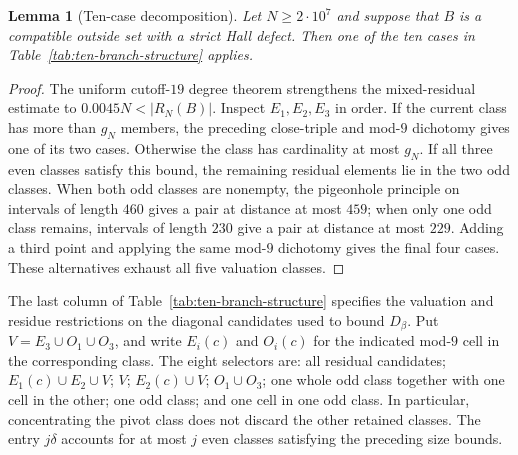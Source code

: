 \documentclass[11pt]{article}
\newtheorem{lemma}[theorem]{Lemma}
\theoremstyle{definition}
\newcommand{\RN}{R_N}
\newcommand{\TwentyMillion}{2\cdot10^7}
\begin{document}
\begin{lemma}[Ten-case decomposition]\label{lem:global-ten-branch-allocation}
Let $N\geq\TwentyMillion$ and suppose that $B$ is a compatible outside set
with a strict Hall defect.  Then one of the ten cases in
Table~\ref{tab:ten-branch-structure} applies.
\end{lemma}

\begin{proof}
The uniform cutoff-$19$ degree theorem strengthens the mixed-residual estimate
to $0.0045N<|\RN(B)|$.  Inspect $E_1,E_2,E_3$ in order.  If the current class
has more than $g_N$ members, the preceding close-triple and mod-$9$
 dichotomy gives one of its two cases.  Otherwise the class has cardinality at
 most $g_N$.  If all three even classes satisfy this bound, the remaining
 residual elements lie in the two odd classes.  When both odd classes are
 nonempty, the pigeonhole principle on intervals of length $460$ gives a pair
 at distance at most $459$; when only one odd class remains, intervals of
 length $230$ give a pair at distance at most $229$.  Adding a third point and
 applying the same mod-$9$ dichotomy gives the final four cases.  These
 alternatives exhaust all five valuation classes.
\end{proof}

The last column of Table~\ref{tab:ten-branch-structure} specifies the
valuation and residue restrictions on the diagonal candidates used to bound
$D_\beta$.  Put $V=E_3\cup O_1\cup O_3$, and write $E_i(c)$ and $O_i(c)$
for the indicated mod-$9$ cell in the corresponding class.  The eight
selectors are: all residual candidates; $E_1(c)\cup E_2\cup V$; $V$;
$E_2(c)\cup V$; $O_1\cup O_3$; one whole odd class together with one cell
in the other; one odd class; and one cell in one odd class.  In particular,
concentrating the pivot class does not discard the other retained classes.
The entry $j\delta$ accounts for at most $j$ even classes satisfying the
preceding size bounds.
\end{document}
